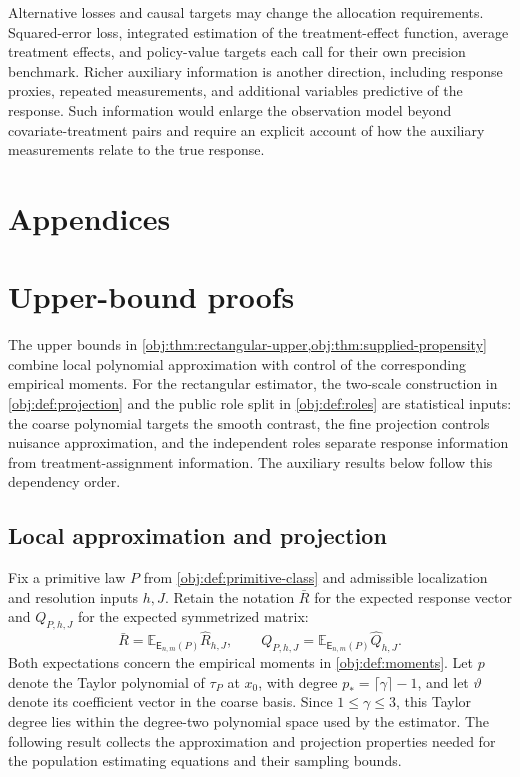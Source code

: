 \documentclass[11pt]{article}
\begin{document}
Alternative losses and causal targets may change the allocation requirements. Squared-error loss, integrated estimation of the treatment-effect function, average treatment effects, and policy-value targets each call for their own precision benchmark. Richer auxiliary information is another direction, including response proxies, repeated measurements, and additional variables predictive of the response. Such information would enlarge the observation model beyond covariate-treatment pairs and require an explicit account of how the auxiliary measurements relate to the true response.


\appendix

\section*{Appendices}

\section{Upper-bound proofs}\label{sec:upper-bound-proofs}

The upper bounds in \cref{obj:thm:rectangular-upper,obj:thm:supplied-propensity} combine local polynomial approximation with control of the corresponding empirical moments. For the rectangular estimator, the two-scale construction in \cref{obj:def:projection} and the public role split in \cref{obj:def:roles} are statistical inputs: the coarse polynomial targets the smooth contrast, the fine projection controls nuisance approximation, and the independent roles separate response information from treatment-assignment information. The auxiliary results below follow this dependency order.

\subsection{Local approximation and projection}

Fix a primitive law \(P\) from \cref{obj:def:primitive-class} and admissible localization and resolution inputs \(h,J\). Retain the notation \(\bar R\) for the expected response vector and \(Q_{P,h,J}\) for the expected symmetrized matrix:
\[
\bar R=\mathbb E_{\mathsf E_{n,m}(P)}\widehat R_{h,J},
\qquad
Q_{P,h,J}=\mathbb E_{\mathsf E_{n,m}(P)}\widehat Q_{h,J}.
\]
Both expectations concern the empirical moments in \cref{obj:def:moments}. Let \(p\) denote the Taylor polynomial of \(\tau_P\) at \(x_0\), with degree \(p_*=\lceil\gamma\rceil-1\), and let \(\vartheta\) denote its coefficient vector in the coarse basis. Since \(1\le\gamma\le3\), this Taylor degree lies within the degree-two polynomial space used by the estimator. The following result collects the approximation and projection properties needed for the population estimating equations and their sampling bounds.
\end{document}
